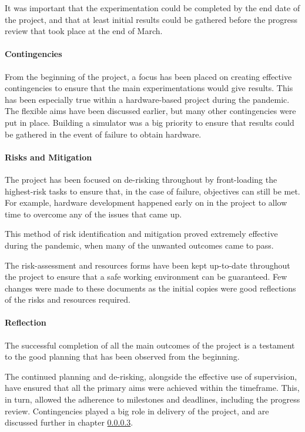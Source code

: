 It was important that the experimentation could be completed by the end date of the project, and that at least initial results could be gathered before the progress review that took place at the end of March.

\paragraph{Contingencies}
From the beginning of the project, a focus has been placed on creating effective contingencies to ensure that the main experimentations would give results. This has been especially true within a hardware-based project during the pandemic. The flexible aims have been discussed earlier, but many other contingencies were put in place. Building a simulator was a big priority to ensure that results could be gathered in the event of failure to obtain hardware.

\paragraph{Risks and Mitigation}
The project has been focused on de-risking throughout by front-loading the highest-risk tasks to ensure that, in the case of failure, objectives can still be met. For example, hardware development happened early on in the project to allow time to overcome any of the issues that came up.

This method of risk identification and mitigation proved extremely effective during the pandemic, when many of the unwanted outcomes came to pass.

The risk-assessment and resources forms have been kept up-to-date throughout the project to ensure that a safe working environment can be guaranteed. Few changes were made to these documents as the initial copies were good reflections of the risks and resources required.

\paragraph{Reflection}
The successful completion of all the main outcomes of the project is a testament to the good planning that has been observed from the beginning.

The continued planning  and de-risking, alongside the effective use of supervision, have ensured that all the primary aims were achieved within the timeframe. This, in turn, allowed the adherence to milestones and deadlines, including the progress review. Contingencies played a big role in delivery of the project, and are discussed further in chapter \ref{}.

